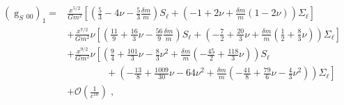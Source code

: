 \begin{align}
\left(\mathop{g}_{S}{}_{00}\right)_1=
&\frac{x^{5/2}}{G m^2}\left[\left(\frac{5}{3} -4 \nu -\frac{5}{3}\frac{\delta m}{m}\right)S_\ell+\left(-1 + 2 \nu+\frac{\delta m}{m}\left(1 -2 \nu\right)\right)\Sigma _\ell\right]\nonumber\\
&+\frac{x^{7/2}}{G m^2}\nu\left[\left(\frac{11}{9} + \frac{16}{3} \nu -\frac{56}{9}\frac{\delta m}{m}\right)S_\ell+\left(-\frac{7}{2} + \frac{20}{3} \nu+\frac{\delta m}{m}\left(\frac{1}{2} + \frac{8}{3} \nu\right)\right)\Sigma _\ell\right]\nonumber\\
&+\frac{x^{9/2}}{G m^2}\nu\left[\left(\frac{9}{4} + \frac{101}{3} \nu -\frac{8}{3} \nu^2+\frac{\delta m}{m}\left(-\frac{45}{2} + \frac{118}{3} \nu\right)\right)S_\ell\right.\nonumber\\
&\qquad\qquad+\left.\left(-\frac{13}{8} + \frac{1009}{30} \nu -64 \nu^2+\frac{\delta m}{m}\left(-\frac{41}{8} + \frac{79}{6} \nu -\frac{4}{3} \nu^2\right)\right)\Sigma _\ell\right]\nonumber\\
&+\mathcal{O}\left(\frac{1}{c^{10}}\right) \;,
\end{align}